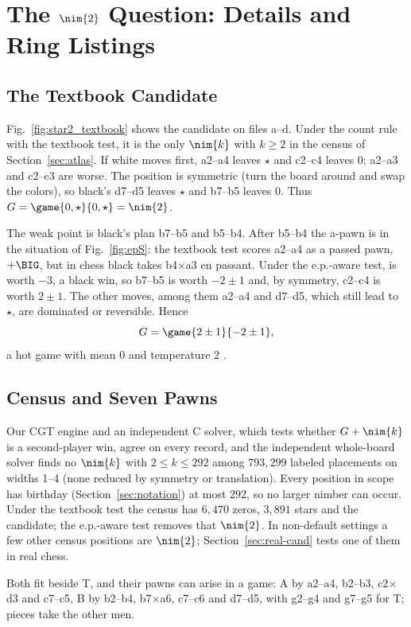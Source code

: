 \section{The \texorpdfstring{$\nim{2}$}{*2} Question: Details and Ring Listings}\label{S-star2}
\subsection{The Textbook Candidate}
Fig.~\ref{fig:star2_textbook} shows the candidate  on files a--d. Under the count rule
with the textbook test, it is the only $\nim{k}$ with $k\ge2$ in the census of Section~\ref{sec:atlas}. If white
moves first, a2--a4 leaves $\star$ and c2--c4 leaves $0$; a2--a3 and c2--c3 are worse. The position is symmetric
(turn the board around and swap the colors), so black's d7--d5 leaves $\star$ and b7--b5 leaves $0$. Thus
$G=\game{0,\star}{0,\star}=\nim{2}$.

The weak point is black's plan b7--b5 and b5--b4. After b5--b4 the a-pawn is in the situation of
Fig.~\ref{fig:epS}: the textbook test scores a2--a4 as a passed pawn, $+\BIG$, but in chess black takes
b4$\times$a3 en passant. Under the e.p.-aware test,  is worth $-3$, a black win, so
b7--b5 is worth $-2\pm1$ and, by symmetry, c2--c4 is worth $2\pm1$. The other moves, among them a2--a4 and
d7--d5, which still lead to $\star$, are dominated or reversible. Hence
\[
G=\game{2\pm1}{-2\pm1},
\]
a hot game with mean $0$ and temperature $2$ .

\subsection{Census and Seven Pawns}
Our CGT engine and an independent C solver, which tests whether $G+\nim{k}$ is a second-player win, agree on
every record, and the independent whole-board solver finds no $\nim{k}$ with $2\le k\le 292$ among
$793{,}299$ labeled placements on widths 1--4 (none reduced by symmetry or translation). Every position in scope has birthday (Section~\ref{sec:notation}) at most $292$, so no
larger nimber can occur. Under the textbook test the census has $6{,}470$ zeros, $3{,}891$ stars and the
candidate; the e.p.-aware test removes that $\nim{2}$. In non-default settings a few other census
positions are $\nim{2}$; Section~\ref{sec:real-cand} tests one of them in real chess.

Both fit beside T, and their pawns can arise in a game: A by a2--a4, b2--b3, c2$\times$d3 and c7--c5, B by
b2--b4, b7$\times$a6, c7--c6 and d7--d5, with g2--g4 and g7--g5 for T; pieces take the other men.

